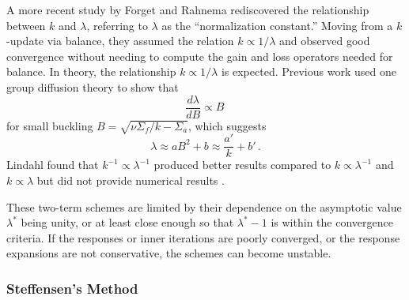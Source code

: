 A more recent study by Forget and Rahnema \cite{forget2005nee} 
rediscovered the relationship
between $k$ and $\lambda$, referring to $\lambda$ as
the ``normalization constant.''
Moving from a $k$-update via balance, they assumed the relation 
$k \propto 1/\lambda$ and observed good convergence without 
needing to compute the gain and loss operators needed for balance.  
In theory, the relationship $k \propto 1/\lambda$ is expected.  
Previous work \cite{roberts2014arm} used one group diffusion 
theory to show that 
\begin{equation}
 \frac{d \lambda}{d B} \propto  B \, 
\end{equation}
for small
buckling $B = \sqrt{\nu \Sigma_f/k - \Sigma_a}$, which
suggests
\begin{equation}
 \lambda \approx  a B^2 + b \approx \frac{a'}{k} + b' \, .
\end{equation}
Lindahl found that $k^{-1} \propto \lambda^{-1}$ produced better results
compared to  $k \propto \lambda^{-1}$ and $k \propto \lambda$ but
did not provide numerical results \cite{lindahl1976mdr}.

These two-term schemes are limited by their
dependence on the asymptotic value $\lambda^*$ being unity, or at least 
close enough so that $\lambda^*-1$ is within the convergence 
criteria.  If the responses or inner iterations are poorly converged, or
the response expansions are not conservative, the 
schemes can become unstable.

\subsubsection{Steffensen's Method}
\label{sec:steffensensmethod}

